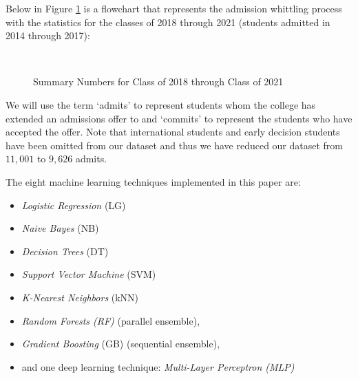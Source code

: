 \documentclass[11pt, oneside]{article}   	%
\begin{document}
Below in Figure \ref{fig:flowchart1} is a flowchart that represents the admission whittling process with the statistics for the classes of 2018 through 2021 (students admitted in 2014 through 2017):
\begin{figure}[H]
\centering
\hfill\\
{\scriptsize {}}
\caption{Summary Numbers for Class of 2018 through Class of 2021}
\label{fig:flowchart1}
\end{figure}
We will use the term `admits' to represent students whom the college has extended an admissions offer to and `commits' to represent the students who have accepted the offer. Note that  international students and early decision students have been omitted from our dataset and thus we have reduced our dataset from $11,001$ to $9,626$  admits.

The eight machine learning techniques implemented in this paper are: 
\begin{itemize}[noitemsep]
\item {\it Logistic Regression} (LG)
\item {\it Naive Bayes} (NB)
\item {\it Decision Trees} (DT)
\item {\it Support Vector Machine} (SVM)
\item {\it K-Nearest Neighbors} (kNN)
\item {\it Random Forests (RF)} (parallel ensemble), 
\item {\it Gradient Boosting} (GB) (sequential ensemble), 
\item and one deep learning technique: {\it Multi-Layer Perceptron (MLP)}
\end{itemize}
\end{document}
